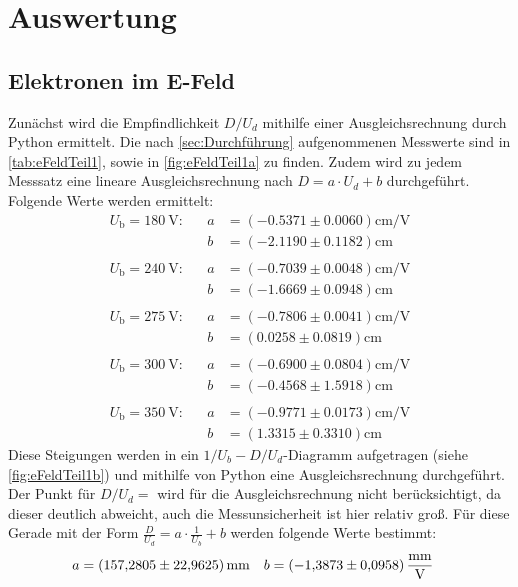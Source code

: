 \section{Auswertung}
\label{sec:Auswertung}
\subsection{Elektronen im E-Feld}
\label{subsec:E-Feld}

Zunächst wird die Empfindlichkeit $D/U_d$ mithilfe einer Ausgleichsrechnung durch Python ermittelt.
Die nach \autoref{sec:Durchführung} aufgenommenen Messwerte sind in \autoref{tab:eFeldTeil1}, sowie in \autoref{fig:eFeldTeil1a} zu finden.
Zudem wird zu jedem Messsatz eine lineare Ausgleichsrechnung nach $D = a \cdot U_d + b$ durchgeführt.
Folgende Werte werden ermittelt:
\begin{align*}
    U_\text{b} = \SI{180}{\volt} :&  &a&= (-0.5371 \pm 0.0060) \si{\centi\metre\per\volt}\\
    &  &b&= (-2.1190 \pm 0.1182)\si{\centi\metre}\\
    \\
    U_\text{b} = \SI{240}{\volt}:& &a&= (-0.7039 \pm 0.0048) \si{\centi\metre\per\volt}\\
    & &b&= (-1.6669 \pm 0.0948) \si{\centi\metre}\\
    \\
    U_\text{b} = \SI{275}{\volt}:& &a&= (-0.7806 \pm 0.0041) \si{\centi\metre\per\volt}\\
    & &b&= (0.0258 \pm 0.0819) \si{\centi\metre} \\
    \\
    U_\text{b} = \SI{300}{\volt}: & &a& = (-0.6900 \pm 0.0804) \si{\centi\metre\per\volt}\\
    & &b& = (-0.4568 \pm 1.5918) \si{\centi\metre}\\
    \\
    U_\text{b} = \SI{350}{\volt}: & &a& = (-0.9771 \pm 0.0173)\si{\centi\metre\per\volt} \\
    & &b&= (1.3315 \pm 0.3310 )\si{\centi\metre}
\end{align*}
\noindent
Diese Steigungen werden in ein $1/U_b - D/U_d$-Diagramm aufgetragen (siehe \autoref{fig:eFeldTeil1b}) und mithilfe von Python eine Ausgleichsrechnung durchgeführt.
Der Punkt für $D/U_d = $ wird für die Ausgleichsrechnung nicht berücksichtigt, da dieser deutlich abweicht, auch die Messunsicherheit ist hier relativ groß.
Für diese Gerade mit der Form $\frac{D}{U_d} = a \cdot \frac{1}{U_b} + b$ werden folgende Werte bestimmt:
\begin{align*}
    a &=  \SI{157.2805 \pm 22.9625}{\milli\metre} &b &= \SI{-1.3873 \pm 0.0958}{\milli\metre\per\volt}
\end{align*}

